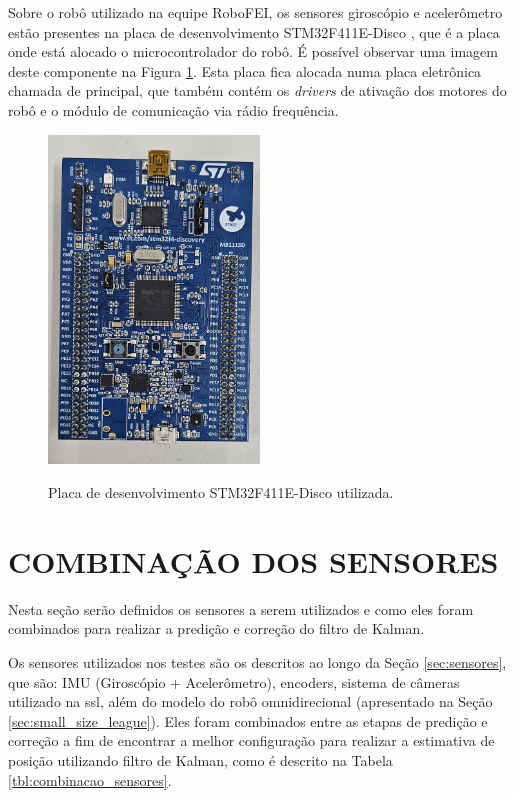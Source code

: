 \documentclass[acronym, symbols, table]{fei}
\begin{document}
		Sobre o robô utilizado na equipe RoboFEI, os sensores giroscópio e acelerômetro estão presentes na placa de desenvolvimento STM32F411E-Disco \cite{datasheet_micro}, que é a placa onde está alocado o microcontrolador do robô. É possível observar uma imagem deste componente na Figura \ref{fig:stm32f411}. Esta placa fica alocada numa placa eletrônica chamada de principal, que também contém os \textit{drivers} de ativação dos motores do robô e o módulo de comunicação via rádio frequência.
		
		\begin{figure}[!htb]
			\centering
			\caption{Placa de desenvolvimento STM32F411E-Disco utilizada.}
			\includegraphics[width=0.5\textwidth]{stm32f411.jpg}
			\label{fig:stm32f411}
		\end{figure}
		
	\section{COMBINAÇÃO DOS SENSORES}\label{sec_metodologia_comb_sensores}
	
		Nesta seção serão definidos os sensores a serem utilizados e como eles foram combinados para realizar a predição e correção do filtro de Kalman.
		
		Os sensores utilizados nos testes são os descritos ao longo da Seção \ref{sec:sensores}, que são: IMU (Giroscópio + Acelerômetro), encoders, sistema de câmeras utilizado na \acrshort{ssl}, além do modelo do robô omnidirecional (apresentado na Seção \ref{sec:small_size_league}). Eles foram combinados entre as etapas de predição e correção a fim de encontrar a melhor configuração para realizar a estimativa de posição utilizando filtro de Kalman, como é descrito na Tabela \ref{tbl:combinacao_sensores}.
		
\end{document}
